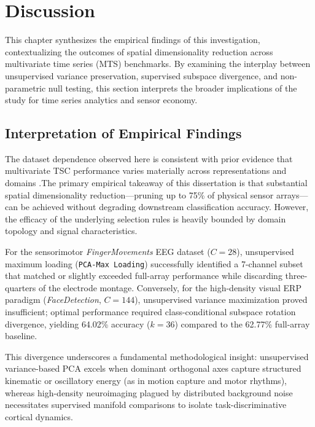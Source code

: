 \chapter{Discussion}
\label{chap:discussion}

\noindent
This chapter synthesizes the empirical findings of this investigation, contextualizing the outcomes of spatial dimensionality reduction across multivariate time series (MTS) benchmarks. By examining the interplay between unsupervised variance preservation, supervised subspace divergence, and non-parametric null testing, this section interprets the broader implications of the study for time series analytics and sensor economy.

\section{Interpretation of Empirical Findings}
\noindent
The dataset dependence observed here is consistent with prior evidence that
multivariate TSC performance varies materially across representations and
domains \citep{ruiz2021multivariate,middlehurst2024bakeoff}.The primary empirical takeaway of this dissertation is that substantial spatial dimensionality reduction—pruning up to 75\% of physical sensor arrays—can be achieved without degrading downstream classification accuracy. However, the efficacy of the underlying selection rules is heavily bounded by domain topology and signal characteristics. 

For the sensorimotor \textit{FingerMovements} EEG dataset ($C = 28$), unsupervised maximum loading (\texttt{PCA-Max Loading}) successfully identified a 7-channel subset that matched or slightly exceeded full-array performance while discarding three-quarters of the electrode montage. Conversely, for the high-density visual ERP paradigm (\textit{FaceDetection}, $C = 144$), unsupervised variance maximization proved insufficient; optimal performance required class-conditional subspace rotation divergence, yielding 64.02\% accuracy ($k = 36$) compared to the 62.77\% full-array baseline. 

This divergence underscores a fundamental methodological insight: unsupervised variance-based PCA excels when dominant orthogonal axes capture structured kinematic or oscillatory energy (as in motion capture and motor rhythms), whereas high-density neuroimaging plagued by distributed background noise necessitates supervised manifold comparisons to isolate task-discriminative cortical dynamics.


